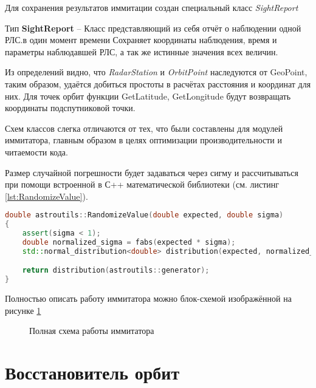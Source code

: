 Для сохранения результатов иммитации создан специальный класс \textit{SightReport}
\begin{mydef} \label{typ:SightReport}
Тип \textbf{SightReport} -- Класс представляющий из себя отчёт о наблюдении одной РЛС.в один момент времени
Сохраняет координаты наблюдения, время и параметры наблюдавшей РЛС, а так же истинные значения всех величин.
\end{mydef}

Из определений видно, что \textit{RadarStation} и \textit{OrbitPoint} наследуются от GeoPoint, таким образом, удаётся
добиться простоты в расчётах расстояния и координат для них. Для точек орбит функции GetLatitude, GetLongitude будут 
возвращать координаты подспутниковой точки.

Схем классов слегка отличаются от тех, что были составлены для модулей иммитатора, главным образом в целях
оптимизации производительности и читаемости кода.

Размер случайной погрешности будет задаваться через сигму и рассчитываться при помощи встроенной в С++
математической библиотеки (см. листинг \ref{lst:RandomizeValue}).
\begin{lstlisting}[language=C++, basicstyle=\fontsize{10}{9}\ttfamily,
	caption={Добавление случайной велечины к измеренной},label={lst:RandomizeValue}]
double astroutils::RandomizeValue(double expected, double sigma)
{
    assert(sigma < 1);
    double normalized_sigma = fabs(expected * sigma);
    std::normal_distribution<double> distribution(expected, normalized_sigma);

    return distribution(astroutils::generator);
}
\end{lstlisting}

Полностью описать работу иммитатора можно блок-схемой изображённой на рисунке \ref{fig:immitator-full-scheme}
\begin{figure}[H]
	\centering
	
	\caption{Полная схема работы иммитатора} \label{fig:immitator-full-scheme}
\end{figure}
\newpage

\section{Восстановитель орбит}

